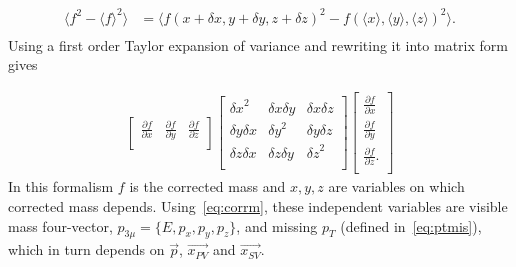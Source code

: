 \begin{equation}
\begin{aligned}
	\langle f^{2}-\langle f \rangle^{2} \rangle  &=  \langle f(x+\delta x, y+\delta y, z+\delta z)^{2} - f(\langle x \rangle, \langle y \rangle, \langle z \rangle)^{2} \rangle. \\
\end{aligned}
\end{equation}
Using a first order Taylor expansion of variance and rewriting it into matrix form gives

\begin{equation}
\begin{aligned}
       \begin{bmatrix}
		\frac{\partial{f}}{\partial{x}} & \frac{\partial{f}}{\partial{y}} & \frac{\partial{f}}{\partial{z}} \\
       \end{bmatrix}
       \begin{bmatrix}
	       {\delta x}^{2} & \delta x \delta y & \delta x \delta z  \\ 
	        \delta y \delta x & {\delta y}^{2} & \delta y \delta z  \\
	        \delta z \delta x & \delta z \delta y & {\delta z}^{2}  \\
       \end{bmatrix}
       \begin{bmatrix}
		\frac{\partial{f}}{\partial{x}} \\ \frac{\partial{f}}{\partial{y}} \\\frac{\partial{f}}{\partial{z}}. \\
       \end{bmatrix}
\end{aligned}
\end{equation}
In this formalism $f$ is the corrected mass and $x,y,z$ are variables on which corrected mass depends. Using~\autoref{eq:corrm}, these independent variables are visible mass four-vector, $p_{3\mu}=\{E,p_{x},p_{y},p_{z}\}$, and missing $p_{T}$ (defined in~\autoref{eq:ptmis}), which in turn depends on $\vec{p}$, $\vec{x_{PV}}$ and $\vec{x_{SV}}$.

